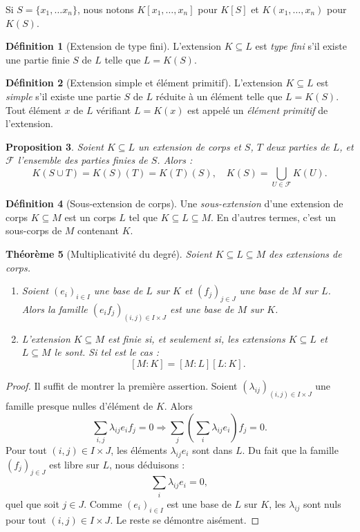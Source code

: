 \documentclass[a4paper, titlepage]{article}
\newtheorem{theo}{Théorème}[section]
\newtheorem{prop}[theo]{Proposition}
\theoremstyle{definition}
\newtheorem{defi}[theo]{Définition}
\theoremstyle{remark}
\begin{document}
Si $S = \{x_1, \dots x_n \}$, nous notons $K[x_1, \dots, x_n]$ pour $K[S]$ et $K(x_1, \dots, x_n)$ pour $K(S)$.

\begin{defi}[Extension de type fini]
L'extension $K \subseteq L$ est \textit{type fini} s'il existe une partie finie $S$ de $L$ telle que $L=K(S)$.
\end{defi}

\begin{defi}[Extension simple et élément primitif]
L'extension $K \subseteq L$ est \textit{simple} s'il existe une partie $S$ de $L$ réduite à un élément telle que $L=K(S)$.
Tout élément $x$ de $L$ vérifiant $L=K(x)$ est appelé un \textit{élément primitif} de l'extension.
\end{defi}

\begin{prop}\label{propExtensions}
Soient $K \subseteq L$ un extension de corps et $S$, $T$ deux parties de $L$, et $\mathcal F$ l'ensemble des parties finies de $S$. Alors :
$$K( S \cup T) = K(S)(T) = K(T)(S), \quad K(S) = \bigcup_{U\in\mathcal F} K(U).$$
\end{prop}

\begin{defi}[Sous-extension de corps]
Une \textit{sous-extension} d'une extension de corps $K\subseteq M$ est un corps $L$ tel que $K\subseteq L \subseteq M$. En d'autres termes, c'est un sous-corps de $M$ contenant $K$.
\end{defi}

\begin{theo}[Multiplicativité du degré]
Soient $K\subseteq L \subseteq M$ des extensions de corps. \begin{enumerate}
\item Soient ${(e_i)}_{i\in I}$ une base de $L$ sur $K$ et ${(f_j)}_{j\in J}$ une base de $M$ sur $L$. Alors la famille ${(e_if_j)}_{(i,j)\in I\times J}$ est une base de $M$ sur $K$.
\item L'extension $K \subseteq M$ est finie si, et seulement si, les extensions $K\subseteq L$ et $L \subseteq M$ le sont. Si tel est le cas :
$$[M:K] = [M:L][L:K].$$
\end{enumerate}
\end{theo}

\begin{proof}
Il suffit de montrer la première assertion. Soient ${(\lambda_{ij})}_{(i,j)\in I\times J}$ une famille presque nulles d'élément de $K$. Alors 
$$\sum_{i,j} \lambda_{ij} e_i f_j = 0 \Rightarrow \sum_j \left( \sum_i\lambda_{ij}e_i\right) f_j = 0.$$
Pour tout $(i,j) \in I\times J$, les éléments $\lambda_{ij}e_i$ sont dans $L$. Du fait que la famille ${(f_j)}_{j\in J}$ est libre sur $L$, nous déduisons :
$$\sum_i\lambda_{ij}e_i = 0,$$
quel que soit $j \in J$. Comme ${(e_i)}_{i\in I}$ est une base de $L$ sur $K$, les $\lambda_{ij}$ sont nuls pour tout $(i,j) \in I\times J$. Le reste se démontre aisément.
\end{proof}
\end{document}
